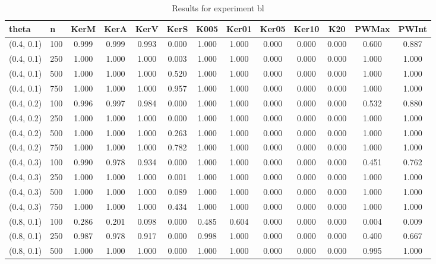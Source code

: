\begin{table}[ht]
	\centering
	
	\caption{Results for experiment bl}
	\tiny{
		\begin{tabular}{ll|ccccccccccc}
			\hline
			theta & n & KerM & KerA & KerV & KerS & K005 & Ker01 & Ker05 & Ker10 & K20 & PWMax & PWInt \\
			\hline
			(0.4, 0.1) & 100 & 0.999 & 0.999 & 0.993 & 0.000 & 1.000 & 1.000 & 0.000 & 0.000 & 0.000 & 0.600 & 0.887 \\
			(0.4, 0.1) & 250 & 1.000 & 1.000 & 1.000 & 0.003 & 1.000 & 1.000 & 0.000 & 0.000 & 0.000 & 1.000 & 1.000 \\
			(0.4, 0.1) & 500 & 1.000 & 1.000 & 1.000 & 0.520 & 1.000 & 1.000 & 0.000 & 0.000 & 0.000 & 1.000 & 1.000 \\
			(0.4, 0.1) & 750 & 1.000 & 1.000 & 1.000 & 0.957 & 1.000 & 1.000 & 0.000 & 0.000 & 0.000 & 1.000 & 1.000 \\
			(0.4, 0.2) & 100 & 0.996 & 0.997 & 0.984 & 0.000 & 1.000 & 1.000 & 0.000 & 0.000 & 0.000 & 0.532 & 0.880 \\
			(0.4, 0.2) & 250 & 1.000 & 1.000 & 1.000 & 0.000 & 1.000 & 1.000 & 0.000 & 0.000 & 0.000 & 1.000 & 1.000 \\
			(0.4, 0.2) & 500 & 1.000 & 1.000 & 1.000 & 0.263 & 1.000 & 1.000 & 0.000 & 0.000 & 0.000 & 1.000 & 1.000 \\
			(0.4, 0.2) & 750 & 1.000 & 1.000 & 1.000 & 0.782 & 1.000 & 1.000 & 0.000 & 0.000 & 0.000 & 1.000 & 1.000 \\
			(0.4, 0.3) & 100 & 0.990 & 0.978 & 0.934 & 0.000 & 1.000 & 1.000 & 0.000 & 0.000 & 0.000 & 0.451 & 0.762 \\
			(0.4, 0.3) & 250 & 1.000 & 1.000 & 1.000 & 0.001 & 1.000 & 1.000 & 0.000 & 0.000 & 0.000 & 1.000 & 1.000 \\
			(0.4, 0.3) & 500 & 1.000 & 1.000 & 1.000 & 0.089 & 1.000 & 1.000 & 0.000 & 0.000 & 0.000 & 1.000 & 1.000 \\
			(0.4, 0.3) & 750 & 1.000 & 1.000 & 1.000 & 0.434 & 1.000 & 1.000 & 0.000 & 0.000 & 0.000 & 1.000 & 1.000 \\
			(0.8, 0.1) & 100 & 0.286 & 0.201 & 0.098 & 0.000 & 0.485 & 0.604 & 0.000 & 0.000 & 0.000 & 0.004 & 0.009 \\
			(0.8, 0.1) & 250 & 0.987 & 0.978 & 0.917 & 0.000 & 0.998 & 1.000 & 0.000 & 0.000 & 0.000 & 0.400 & 0.667 \\
			(0.8, 0.1) & 500 & 1.000 & 1.000 & 1.000 & 0.000 & 1.000 & 1.000 & 0.000 & 0.000 & 0.000 & 0.995 & 1.000 \\

\end{tabular}}
\end{table}
